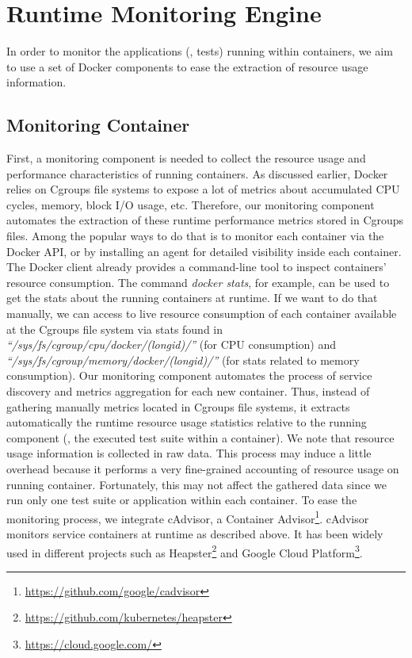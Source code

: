 





\section{Runtime Monitoring Engine}
\label{mon:Runtime Testing}
In order to monitor the applications (\ie, tests) running within containers, we aim to use a set of Docker components to ease the extraction of resource usage information.


\subsection{Monitoring Container}
First, a monitoring component is needed to collect the resource usage and performance characteristics of running containers. As discussed earlier, Docker relies on Cgroups file systems to expose a lot of metrics about accumulated CPU cycles, memory, block I/O usage, etc. Therefore, our monitoring component automates the extraction of these runtime performance metrics stored in Cgroups files. 
Among the popular ways to do that is to monitor each container via the Docker API, or by installing an agent for detailed visibility inside each container. 
The Docker client already provides a command-line tool to inspect containers' resource consumption. The command \textit{docker stats}, for example, can be used to get the stats about the running containers at runtime. 
If we want to do that manually, we can access to live resource consumption of each container available at the Cgroups file system via stats found in \textit{``/sys/fs/cgroup/cpu/docker/(longid)/''} (for CPU consumption) and \textit{``/sys/fs/cgroup/memory/docker/(longid)/''} (for stats related to memory consumption). Our monitoring component automates the process of service discovery and metrics aggregation for each new container. Thus, instead of gathering manually metrics located in Cgroups file systems, it extracts automatically the runtime resource usage statistics relative to the running component (\ie, the executed test suite within a container). We note that resource usage information is collected in raw data. This process may induce a little overhead because it performs a very fine-grained accounting of resource usage on running container. Fortunately, this may not affect the gathered data since we run only one test suite or application within each container.
To ease the monitoring process, we integrate cAdvisor, a Container Advisor\footnote{\url{https://github.com/google/cadvisor}}. cAdvisor monitors service containers at runtime as described above. It has been widely used in different projects such as Heapster\footnote{\url{https://github.com/kubernetes/heapster}} and Google Cloud Platform\footnote{\url{https://cloud.google.com/}}. 

